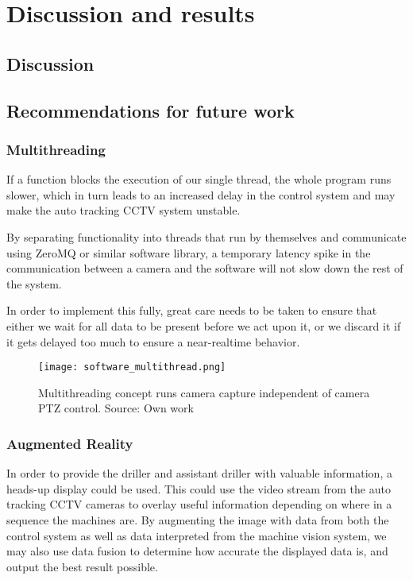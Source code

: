 \chapter{Discussion and results}
\section{Discussion}
\section{Recommendations for future work}



\subsection{Multithreading}
If a function blocks the execution of our single thread, the whole program runs slower, which in turn leads to an increased delay in the control system and may make the auto tracking CCTV system unstable.

By separating functionality into threads that run by themselves and communicate using ZeroMQ or similar software library, a temporary latency spike in the communication between a camera and the software will not slow down the rest of the system.

In order to implement this fully, great care needs to  be taken to ensure that either we wait for all data to be present before we act upon it, or we discard it if it gets delayed too much to ensure a near-realtime behavior.

\begin{figure}[ht]
    \centering
    \texttt{[image: software\_multithread.png]}
    \caption{Multithreading concept runs camera capture independent of camera PTZ control. Source: Own work}
    \label{fig:software_multithread}
\end{figure}
\FloatBarrier

\subsection{Augmented Reality}
In order to provide the driller and assistant driller with valuable information, a heads-up display could be used. This could use the video stream from the auto tracking CCTV cameras to overlay useful information depending on where in a sequence the machines are. By augmenting the image with data from both the control system as well as data interpreted from the machine vision system, we may also use data fusion to determine how accurate the displayed data is, and output the best result possible.

